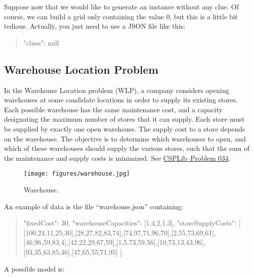 \documentclass[10pt]{article}
\newenvironment{myvb}{\endgraf\small\verbatim}{\endverbatim}
\begin{document}
Suppose now that we would like to generate an instance without any clue.
Of course, we can build a grid only containing the value 0, but this is a little bit tedious. 
Actually, you just need to use a JSON file like this:

\begin{quote}
\begin{myvb}
{
  "clues": null
}
\end{myvb}
\end{quote}


\subsection{Warehouse Location Problem}

In the Warehouse Location problem (WLP), a company considers opening warehouses at some candidate locations in order to supply its existing stores.
Each possible warehouse has the same maintenance cost, and a capacity designating the maximum number of stores that it can supply.
Each store must be supplied by exactly one open warehouse.
The supply cost to a store depends on the warehouse.
The objective is to determine which warehouses to open, and which of these warehouses should supply the various stores, such that the sum of the maintenance and supply costs is minimized.
See \href{http://csplib.org/Problems/prob034/}{CSPLib--Problem 034}.

\begin{figure}[h]
\begin{center}
  \texttt{[image: figures/warehouse.jpg]}
\end{center}
\caption{Warehouse.\label{fig:warehouse}}
\end{figure}

An example of data is the file ``warehouse.json'' containing:

{\small
  \begin{quote}
\begin{myvb}
{
  "fixedCost": 30,
  "warehouseCapacities": [1,4,2,1,3],
  "storeSupplyCosts": [
    [100,24,11,25,30],[28,27,82,83,74],[74,97,71,96,70],[2,55,73,69,61],
    [46,96,59,83,4],[42,22,29,67,59],[1,5,73,59,56],[10,73,13,43,96],
    [93,35,63,85,46],[47,65,55,71,95]
  ]
}
\end{myvb}
\end{quote}
}

A possible model is:
\end{document}
